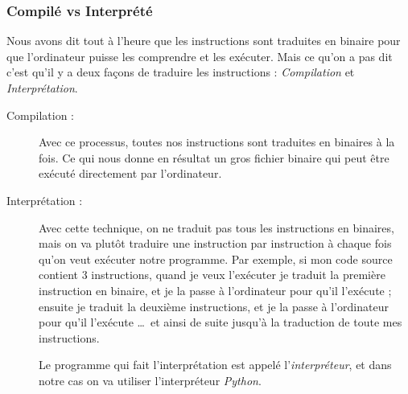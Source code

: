 \documentclass[12pt]{article}
\begin{document}
        \subsubsection{Compilé vs Interprété}
            Nous avons dit tout à l'heure que les instructions sont traduites en binaire pour que l'ordinateur puisse
            les comprendre et les exécuter. Mais ce qu'on a pas dit c'est qu'il y a deux façons de traduire 
            les instructions : \emph{Compilation} et \emph{Interprétation}.

            \begin{description}
                \item[Compilation :] Avec ce processus, toutes nos instructions sont traduites en binaires à la fois.
                    Ce qui nous donne en résultat un gros fichier binaire qui peut être exécuté directement par
                    l'ordinateur.
                \item[Interprétation :] Avec cette technique, on ne traduit pas tous les instructions en binaires, mais
                    on va plutôt traduire une instruction par instruction à chaque fois qu'on veut exécuter 
                    notre programme. Par exemple, si mon code source contient 3 instructions, quand je veux l'exécuter je
                    traduit la première instruction en binaire, et je la passe à l'ordinateur pour qu'il l'exécute ;
                    ensuite je traduit la deuxième instructions, et je la passe à l'ordinateur pour qu'il l'exécute
                    \ldots\ et ainsi de suite jusqu'à la traduction de toute
                    mes instructions.

                    Le programme qui fait l'interprétation est appelé l'\emph{interpréteur}, et dans notre cas on va utiliser
                    l'interpréteur \emph{Python}.
            \end{description}
\end{document}
